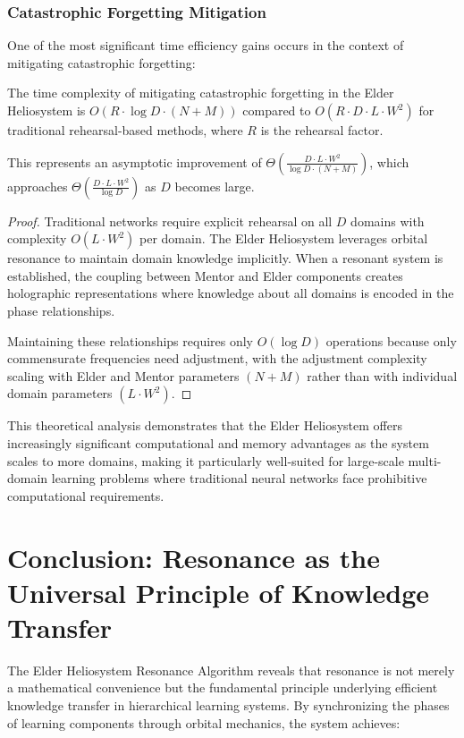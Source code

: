 \subsubsection{Catastrophic Forgetting Mitigation}

One of the most significant time efficiency gains occurs in the context of mitigating catastrophic forgetting:

\begin{theorem}
The time complexity of mitigating catastrophic forgetting in the Elder Heliosystem is $O(R \cdot \log D \cdot (N + M))$ compared to $O(R \cdot D \cdot L \cdot W^2)$ for traditional rehearsal-based methods, where $R$ is the rehearsal factor.

This represents an asymptotic improvement of $\Theta(\frac{D \cdot L \cdot W^2}{\log D \cdot (N + M)})$, which approaches $\Theta(\frac{D \cdot L \cdot W^2}{\log D})$ as $D$ becomes large.
\end{theorem}

\begin{proof}
Traditional networks require explicit rehearsal on all $D$ domains with complexity $O(L \cdot W^2)$ per domain. The Elder Heliosystem leverages orbital resonance to maintain domain knowledge implicitly. When a resonant system is established, the coupling between Mentor and Elder components creates holographic representations where knowledge about all domains is encoded in the phase relationships. 

Maintaining these relationships requires only $O(\log D)$ operations because only commensurate frequencies need adjustment, with the adjustment complexity scaling with Elder and Mentor parameters $(N + M)$ rather than with individual domain parameters $(L \cdot W^2)$.
\end{proof}

This theoretical analysis demonstrates that the Elder Heliosystem offers increasingly significant computational and memory advantages as the system scales to more domains, making it particularly well-suited for large-scale multi-domain learning problems where traditional neural networks face prohibitive computational requirements.

\section{Conclusion: Resonance as the Universal Principle of Knowledge Transfer}

The Elder Heliosystem Resonance Algorithm reveals that resonance is not merely a mathematical convenience but the fundamental principle underlying efficient knowledge transfer in hierarchical learning systems. By synchronizing the phases of learning components through orbital mechanics, the system achieves:

